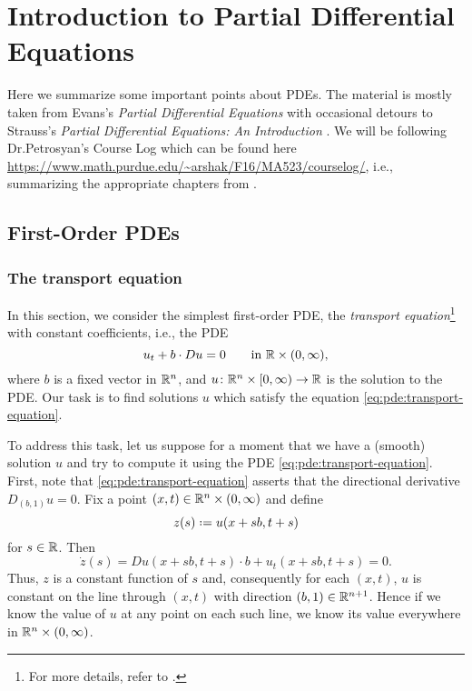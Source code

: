 \chapter{Introduction to Partial Differential Equations}
Here we summarize some important points about PDEs. The material is mostly
taken from Evans's \emph{Partial Differential Equations} \cite{evans} with
occasional detours to Strauss's \emph{Partial Differential Equations: An
  Introduction} \cite{strauss}. We will be following Dr.\@ Petrosyan's
\textsf{Course Log} which can be found here
\url{https://www.math.purdue.edu/~arshak/F16/MA523/courselog/}, i.e.,
summarizing the appropriate chapters from \cite{evans}.

\section{First-Order PDEs}
\subsection{The transport equation}
In this section, we consider the simplest first-order PDE, the
\emph{transport equation}\footnote{For more details, refer to \cite[\S
  2.1]{evans}.} with constant coefficients, i.e., the PDE
\begin{equation}
  \label{eq:pde:transport-equation}
  u_t+b\cdot Du=0\qquad\text{in \(\mathbb{R}\times(0,\infty)\),}
\end{equation}
where \(b\) is a fixed vector in \(\mathbb{R}^n\), and
\(u\colon\mathbb{R}^n\times[0,\infty)\to\mathbb{R}\) is the solution to the PDE. Our
task is to find solutions \(u\) which satisfy the equation
\eqref{eq:pde:transport-equation}.

To address this task, let us suppose for a moment that we have a (smooth)
solution \(u\) and try to compute it using the PDE
\eqref{eq:pde:transport-equation}. First, note that
\eqref{eq:pde:transport-equation} asserts that the directional derivative
\(D_{(b,1)}u=0\). Fix a point \((x,t)\in\mathbb{R}^n\times(0,\infty)\) and define
\[
  z(s)\defeq u(x+sb,t+s)
\]
for \(s\in\mathbb{R}\). Then
\[
  \dot z(s)=Du(x+sb,t+s)\cdot b+u_t(x+sb,t+s)=0.
\]
Thus, \(z\) is a constant function of \(s\) and, consequently for each
\((x,t)\), \(u\) is constant on the line through \((x,t)\) with direction
\((b,1)\in\mathbb{R}^{n+1}\). Hence if we know the value of \(u\) at any point on
each such line, we know its value everywhere in \(\mathbb{R}^n\times(0,\infty)\).

